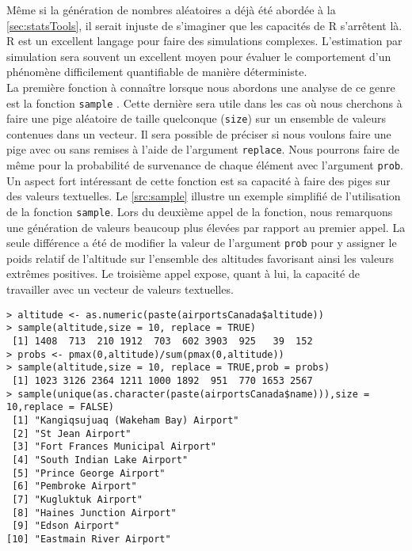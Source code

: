 Même si la génération de nombres aléatoires a déjà été abordée à la \autoref{sec:statsTools}, il serait injuste de s'imaginer que les capacités de R s'arrêtent là. R est un excellent langage pour faire des simulations complexes. L'estimation par simulation sera souvent un excellent moyen pour évaluer le comportement d'un phénomène difficilement quantifiable de manière déterministe. \\

La première fonction à connaître lorsque nous abordons une analyse de ce genre est la fonction \texttt{sample} \cite{Rfunction:sample}. Cette dernière sera utile dans les cas où nous cherchons à faire une pige aléatoire de taille quelconque (\texttt{size}) sur un ensemble de valeurs contenues dans un vecteur. Il sera possible de préciser si nous voulons faire une pige avec ou sans remises à l'aide de l'argument \texttt{replace}. Nous pourrons faire de même pour la probabilité de survenance de chaque élément avec l'argument \texttt{prob}. Un aspect fort intéressant de cette fonction est sa capacité à faire des piges sur des valeurs textuelles. Le \autoref{src:sample} illustre un exemple simplifié de l'utilisation de la fonction \texttt{sample}. Lors du deuxième appel de la fonction, nous remarquons une génération de valeurs beaucoup plus élevées par rapport au premier appel. La seule différence a été de modifier la valeur de l'argument \texttt{prob} pour y assigner le poids relatif de l'altitude sur l'ensemble des altitudes favorisant ainsi les valeurs extrêmes positives. Le troisième appel expose, quant à lui, la capacité de travailler avec un vecteur de valeurs textuelles. \\

\begin{lstlisting}[caption = Pige aléatoire sur support vectoriel,label=src:sample]
> altitude <- as.numeric(paste(airportsCanada$altitude))
> sample(altitude,size = 10, replace = TRUE)
 [1] 1408  713  210 1912  703  602 3903  925   39  152
> probs <- pmax(0,altitude)/sum(pmax(0,altitude))
> sample(altitude,size = 10, replace = TRUE,prob = probs)
 [1] 1023 3126 2364 1211 1000 1892  951  770 1653 2567
> sample(unique(as.character(paste(airportsCanada$name))),size = 10,replace = FALSE)
 [1] "Kangiqsujuaq (Wakeham Bay) Airport"
 [2] "St Jean Airport"                   
 [3] "Fort Frances Municipal Airport"    
 [4] "South Indian Lake Airport"         
 [5] "Prince George Airport"             
 [6] "Pembroke Airport"                  
 [7] "Kugluktuk Airport"                 
 [8] "Haines Junction Airport"           
 [9] "Edson Airport"                     
[10] "Eastmain River Airport"  
\end{lstlisting}

